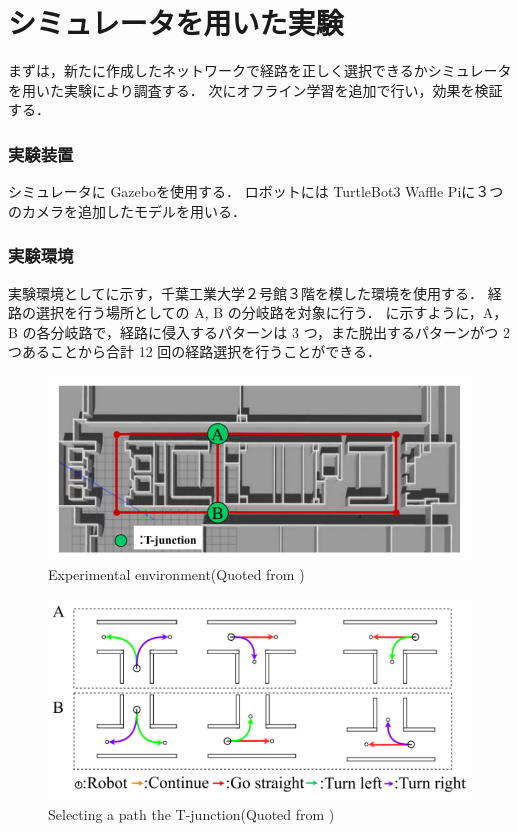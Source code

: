 \section{シミュレータを用いた実験}
まずは，新たに作成したネットワークで経路を正しく選択できるかシミュレータを用いた実験により調査する．
次にオフライン学習を追加で行い，効果を検証する．

\subsubsection{実験装置}
シミュレータに Gazebo\cite{gazebo}を使用する．
ロボットには TurtleBot3 Waffle Pi\cite{turtlebot3}に３つのカメラを追加したモデルを用いる．

\subsubsection{実験環境}
実験環境としてに示す，千葉工業大学２号館３階を模した環境を使用する．
経路の選択を行う場所としての A, B の分岐路を対象に行う．
に示すように，A，B の各分岐路で，経路に侵入するパターンは 3 つ，また脱出するパターンがつ 2 つあることから合計 12 回の経路選択を行うことができる．

\begin{figure}
  \centering
  \includegraphics[width=130mm]{images/pdf/haruyama/cit3f.pdf}
  \caption[Experimental environment]{Experimental environment(Quoted from \cite{haruyama2022})}
  \label{fig:haruyama_cit3f}
\end{figure}

\begin{figure}
  \centering
  \includegraphics[width=130mm]{images/pdf/haruyama/select_pattern.pdf}
  \caption[Selecting a path the T-junction]{Selecting a path the T-junction(Quoted from \cite{haruyama2022})}
  \label{fig:select_pattern}
\end{figure}
 
